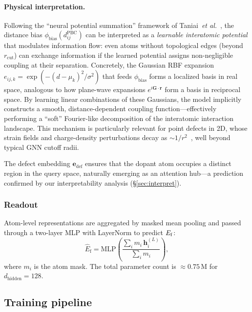 \paragraph{Physical interpretation.}
Following the ``neural potential summation'' framework of
Taniai~\textit{et al.}~\cite{crystalformer2024}, the distance bias
$\phi_\mathrm{bias}(d_{ij}^{\mathrm{PBC}})$ can be interpreted as a
\emph{learnable interatomic potential} that modulates information flow:
even atoms without topological edges (beyond $r_\mathrm{cut}$) can exchange
information if the learned potential assigns non-negligible coupling at their
separation.
%
Concretely, the Gaussian RBF expansion
$e_{ij,k} = \exp(-(d-\mu_k)^2/\sigma^2)$ that feeds $\phi_\mathrm{bias}$
forms a localized basis in real space, analogous to how plane-wave
expansions $e^{i\mathbf{G}\cdot\mathbf{r}}$ form a basis in reciprocal
space.
By learning linear combinations of these Gaussians, the model implicitly
constructs a smooth, distance-dependent coupling function---effectively
performing a ``soft'' Fourier-like decomposition of the interatomic
interaction landscape.
%
This mechanism is particularly relevant for point defects in 2D, whose
strain fields and charge-density perturbations decay as
${\sim}1/r^2$~\cite{fang2025}, well beyond typical GNN cutoff radii.

The defect embedding $\mathbf{e}_\mathrm{def}$ ensures that the dopant atom
occupies a distinct region in the query space, naturally emerging as an
attention hub---a prediction confirmed by our interpretability analysis
(\S\ref{sec:interpret}).

\subsubsection{Readout}

Atom-level representations are aggregated by masked mean pooling and passed
through a two-layer MLP with LayerNorm to predict $E_\mathrm{f}$:
\begin{equation}
  \hat{E}_\mathrm{f} = \mathrm{MLP}\!\left(
    \frac{\sum_{i} m_i \,\mathbf{h}_i^{(L)}}
         {\sum_{i} m_i}
  \right),
\end{equation}
where $m_i$ is the atom mask.
The total parameter count is ${\approx}0.75$\,M for
$d_\mathrm{hidden} = 128$.

\subsection{Training pipeline}\label{sec:training}

